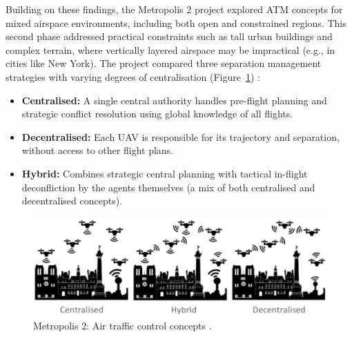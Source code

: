 
Building on these findings, the Metropolis 2 project explored \gls{ATM} concepts for mixed airspace environments, including both open and constrained regions. 
This second phase addressed practical constraints such as tall urban buildings and complex terrain, where vertically layered airspace may be impractical (e.g., in cities like New York).
The project compared three separation management strategies with varying degrees of centralisation (Figure~\ref{atc-concepts}) \cite{Patrinopoulou_2022}:

\begin{itemize}
    \item \textbf{Centralised:} A single central authority handles pre-flight planning and strategic conflict resolution using global knowledge of all flights.
    \item \textbf{Decentralised:} Each \gls{UAV} is responsible for its trajectory and separation, without access to other flight plans.
    \item \textbf{Hybrid:} Combines strategic central planning with tactical in-flight deconfliction by the agents themselves (a mix of both centralised and decentralised concepts).
\end{itemize}

\begin{figure}[!ht]
    \centering
    \includegraphics[width=.7\textwidth]{img/metropolis-ii-airspace.png}
    \caption{Metropolis 2: Air traffic control concepts \cite{Badea_2022}.}
    \label{atc-concepts}
\end{figure}


